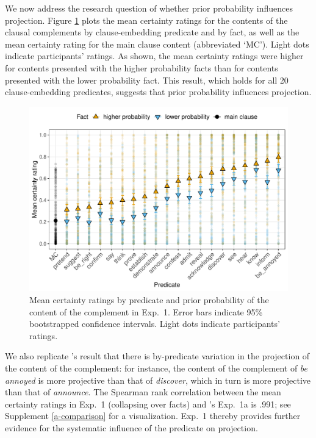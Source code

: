 \documentclass[11pt,fleqn]{article}
\newcommand{\6}{\mbox{$[\hspace*{-.6mm}[$}}
\newcommand{\9}{\mbox{$]\hspace*{-.6mm}]$}}
\newcommand{\citepos}[1]{\citeauthor{#1}'s \citeyear{#1}}
\begin{document}
We now address the research question of whether prior probability influences projection. Figure \ref{f-projection-mean} plots the mean certainty ratings for the contents of the clausal complements by clause-embedding predicate and by fact, as well as the mean certainty rating for the main clause content (abbreviated `MC'). Light dots indicate participants' ratings. As shown, the mean certainty ratings were higher for contents  presented with the higher probability facts than for contents presented with the lower probability fact. This result, which holds for all 20 clause-embedding predicates, suggests that prior probability influences projection.

\begin{figure}[h!]
\centering

\includegraphics[width=.75\paperwidth]{../../results/exp4/graphs/means-projectivity-by-predicate-and-prior}

\caption{Mean certainty ratings by predicate and prior probability of the content of the complement in Exp.~1. Error bars indicate 95\% bootstrapped confidence intervals. Light dots indicate participants' ratings.} 
\label{f-projection-mean}
\end{figure}
We also replicate \citepos{tonhauser-degen-factive} result that there is by-predicate variation in the projection of the content of the complement: for instance, the content of the complement of {\em be annoyed} is more projective than that of {\em discover}, which in turn is more projective than that of {\em announce}. The Spearman rank correlation between the mean certainty ratings in Exp.~1 (collapsing over facts) and \citepos{tonhauser-degen-factive} Exp.~1a is .991; see Supplement \ref{a-comparison} for a visualization. Exp.~1 thereby provides further evidence for the systematic influence of the predicate on projection.
\end{document}
